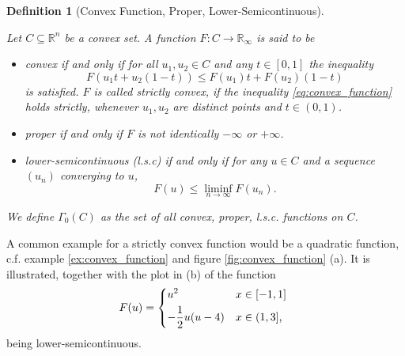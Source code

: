 \documentclass{scrreprt}
\newtheorem{definition}[theorem]{Definition}
\begin{document}
        \begin{definition}[Convex Function, Proper, Lower-Semicontinuous] %
        \label{def:convex_function_proper_lower_semicontinuous}

            Let $C \subseteq \mathbb{R}^{n}$ be a convex set. A function $F: C \longrightarrow \mathbb{R}_{\infty}$ is said to be
                \begin{itemize}
                    \item convex if and only if for all $u_{1}, u_{2} \in C$ and any $t \in [0, 1]$ the inequality
                    \begin{equation}
                        F(u_{1}t + u_{2}(1 - t)) \le F(u_{1})t + F(u_{2})(1 - t)
                        \label{eq:convex_function}
                    \end{equation}
                    is satisfied. $F$ is called strictly convex, if the inequality \ref{eq:convex_function} holds strictly, whenever $u_{1}, u_{2}$ are distinct points and $t \in (0, 1)$.
                    \item proper if and only if $F$ is not identically $-\infty$ or $+\infty$.
                    \item lower-semicontinuous (l.s.c) if and only if for any $u \in C$ and a sequence $(u_{n})$ converging to $u$,
                        $$
                            F(u) \le \liminf_{n \rightarrow \infty} F(u_{n}).
                        $$
                \end{itemize}
            We define $\Gamma_{0}(C)$ as the set of all convex, proper, l.s.c. functions on $C$.

        \end{definition}

        A common example for a strictly convex function would be a quadratic function, c.f. example \ref{ex:convex_function} and figure \ref{fig:convex_function} (a). It is illustrated, together with the plot in (b) of the function
            \begin{equation}
                F(u) =
                    \begin{dcases*}
                        u^{2} & \textnormal{$x \in [-1, 1]$} \\
                        - \frac{1}{2} u(u - 4) & \textnormal{$x \in (1, 3]$},
                    \end{dcases*}
                \label{eq:lsc_example}
            \end{equation}
        being lower-semicontinuous.
\end{document}
